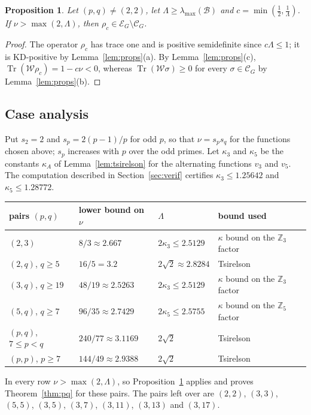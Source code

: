 \documentclass[11pt,a4paper]{article}
\newtheorem{proposition}[theorem]{Proposition}
\theoremstyle{definition}
\theoremstyle{plain}
\DeclareMathOperator{\Tr}{Tr}
\newcommand{\Z}{\mathbb Z}
\newcommand{\E}{\mathcal E}
\newcommand{\hull}{\mathcal C}
\newcommand{\B}{\mathcal B}
\newcommand{\Wc}{\mathcal W}
\begin{document}
\begin{proposition}\label{prop:crit}
Let $(p,q)\neq(2,2)$, let $\Lambda\geq\lambda_{\max}(\B)$ and
$c=\min(\frac12,\frac1\Lambda)$. If $\nu>\max(2,\Lambda)$, then
$\rho_c\in\E_G\setminus\hull_G$.
\end{proposition}

\begin{proof}
The operator $\rho_c$ has trace one and is positive semidefinite since
$c\Lambda\leq1$; it is KD-positive by Lemma~\ref{lem:props}(a). By
Lemma~\ref{lem:props}(c), $\Tr(\Wc\rho_c)=1-c\nu<0$, whereas
$\Tr(\Wc\sigma)\geq0$ for every $\sigma\in\hull_G$ by
Lemma~\ref{lem:props}(b).
\end{proof}

\subsection{Case analysis}
Put $s_2=2$ and $s_p=2(p-1)/p$ for odd $p$, so that $\nu=s_ps_q$ for the
functions chosen above; $s_p$ increases with $p$ over the odd primes. Let
$\kappa_3$ and $\kappa_5$ be the constants $\kappa_A$ of
Lemma~\ref{lem:tsirelson} for the alternating functions $v_3$ and $v_5$. The
computation described in Section~\ref{sec:verif} certifies
$\kappa_3\leq1.25642$ and $\kappa_5\leq1.28772$.
\begin{center}
\renewcommand{\arraystretch}{1.25}
\begin{tabular}{llll}
\hline
pairs $(p,q)$ & lower bound on $\nu$ & $\Lambda$ & bound used\\
\hline
$(2,3)$ & $8/3\approx2.667$ & $2\kappa_3\leq2.5129$ & $\kappa$ bound on the $\Z_3$ factor\\
$(2,q)$, $q\geq5$ & $16/5=3.2$ & $2\sqrt2\approx2.8284$ & Tsirelson\\
$(3,q)$, $q\geq19$ & $48/19\approx2.5263$ & $2\kappa_3\leq2.5129$ & $\kappa$ bound on the $\Z_3$ factor\\
$(5,q)$, $q\geq7$ & $96/35\approx2.7429$ & $2\kappa_5\leq2.5755$ & $\kappa$ bound on the $\Z_5$ factor\\
$(p,q)$, $7\leq p<q$ & $240/77\approx3.1169$ & $2\sqrt2$ & Tsirelson\\
$(p,p)$, $p\geq7$ & $144/49\approx2.9388$ & $2\sqrt2$ & Tsirelson\\
\hline
\end{tabular}
\end{center}
In every row $\nu>\max(2,\Lambda)$, so Proposition~\ref{prop:crit} applies and
proves Theorem~\ref{thm:pq} for these pairs. The pairs left over are $(2,2)$,
$(3,3)$, $(5,5)$, $(3,5)$, $(3,7)$, $(3,11)$, $(3,13)$ and $(3,17)$.
\end{document}
